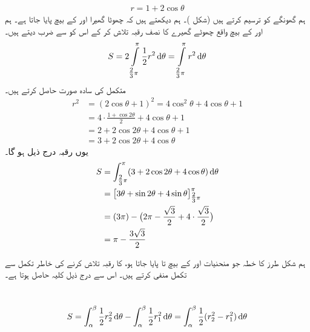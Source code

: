 \begin{align*}
r=1+2\cos\theta
\end{align*}
ہم گھونگے کو ترسیم کرتے ہیں (شکل )۔ ہم دیکھتے ہیں کہ چھوٹا گھیرا  اور  کے بیچ پایا جاتا ہے۔ ہم    اور   کے بیچ واقع   چھوٹے گھیرے کا نصف رقبہ تلاش کر کے  اس کو  سے ضرب دیتے ہیں۔
\begin{align*}
S=2\int\limits_{\tfrac{2}{3}\pi}^{\pi}\frac{1}{2}r^2\dif\theta=\int\limits_{\tfrac{2}{3}\pi}^{\pi}r^2\dif \theta
\end{align*}
متکمل  کی سادہ صورت حاصل کرتے ہیں۔ 
\begin{align*}
r^2&=(2\cos\theta+1)^2=4\cos^2\theta+4\cos\theta+1\\
&=4\cdot\frac{1+\cos2\theta}{2}+4\cos\theta+1\\
&=2+2\cos2\theta+4\cos\theta+1\\
&=3+2\cos2\theta+4\cos\theta
\end{align*}
یوں رقبہ درج ذیل ہو گا۔
\begin{align*}
S&=\int_{\tfrac{2}{3}\pi}^{\pi} (3+2\cos2\theta+4\cos\theta)\dif \theta\\
&=\big[3\theta+\sin2\theta+4\sin\theta\big]_{\tfrac{2}{3}\pi}^{\pi}\\
&=(3\pi)-\big(2\pi-\frac{\sqrt{3}}{2}+4\cdot\frac{\sqrt{3}}{2}\big)\\
&=\pi-\frac{3\sqrt{3}}{2}
\end{align*}

ہم شکل  طرز کا  خطہ جو منحنیات  اور  کے بیچ  تا   پایا جاتا ہو، کا رقبہ تلاش کرنے کی خاطر تکمل  سے تکمل  منفی کرتے ہیں۔ اس سے درج ذیل کلیہ حاصل ہوتا ہے۔

\\
\begin{align}\label{مساوات_مخروط_رقبہ_قطبی_رداس_کے_بیچ}
S=\int_{\alpha}^{\beta}\frac{1}{2}r_2^2\dif\theta-\int_{\alpha}^{\beta}\frac{1}{2}r_1^2\dif\theta=\int_{\alpha}^{\beta}\frac{1}{2}(r_2^2-r_1^2)\dif\theta
\end{align}

